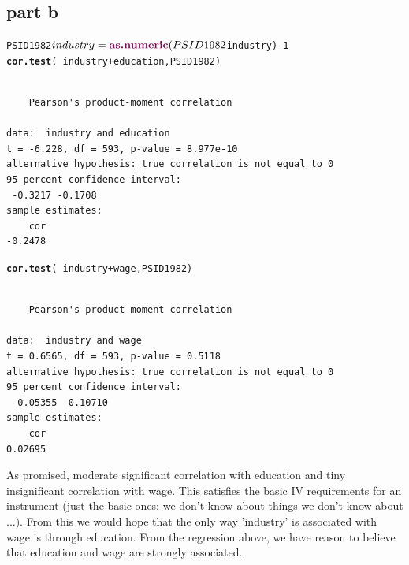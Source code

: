 \documentclass{article}\usepackage{graphicx, color}
\makeatletter
\newcommand{\hlfunctioncall}[1]{\textcolor[rgb]{0.501960784313725,0,0.329411764705882}{\textbf{#1}}}%
\newenvironment{kframe}{%
 \def\at@end@of@kframe{}%
 \ifinner\ifhmode%
  \def\at@end@of@kframe{\end{minipage}}%
  \begin{minipage}{\columnwidth}%
 \fi\fi%
 \def\FrameCommand##1{\hskip\@totalleftmargin \hskip-\fboxsep
 \colorbox{shadecolor}{##1}\hskip-\fboxsep
     \hskip-\linewidth \hskip-\@totalleftmargin \hskip\columnwidth}%
 \MakeFramed {\advance\hsize-\width
   \@totalleftmargin\z@ \linewidth\hsize
   \@setminipage}}%
 {\par\unskip\endMakeFramed%
 \at@end@of@kframe}
\newenvironment{knitrout}{}{} %
\makeatother
\begin{document}
\subsection*{part b}
\begin{knitrout}
\color{fgcolor}\begin{kframe}
\begin{alltt}
PSID1982$industry=\hlfunctioncall{as.numeric}(PSID1982$industry)-1
\hlfunctioncall{cor.test}(~industry+education, PSID1982)
\end{alltt}
\begin{verbatim}

	Pearson's product-moment correlation

data:  industry and education 
t = -6.228, df = 593, p-value = 8.977e-10
alternative hypothesis: true correlation is not equal to 0 
95 percent confidence interval:
 -0.3217 -0.1708 
sample estimates:
    cor 
-0.2478 

\end{verbatim}
\begin{alltt}
\hlfunctioncall{cor.test}(~industry+wage, PSID1982)
\end{alltt}
\begin{verbatim}

	Pearson's product-moment correlation

data:  industry and wage 
t = 0.6565, df = 593, p-value = 0.5118
alternative hypothesis: true correlation is not equal to 0 
95 percent confidence interval:
 -0.05355  0.10710 
sample estimates:
    cor 
0.02695 

\end{verbatim}
\end{kframe}
\end{knitrout}

As promised, moderate significant correlation with education and tiny insignificant correlation with wage. This satisfies the basic IV requirements for an instrument (just the basic ones: we don't know about things we don't know about ...). From this we would hope that the only way 'industry' is associated with wage is through education. From the regression above, we have reason to believe that education and wage are strongly associated.
\end{document}
